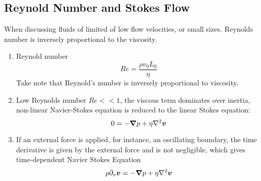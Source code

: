\documentclass[12pt,a4paper]{article}
\begin{document}
        \subsection{Reynold Number and Stokes Flow}
            When discussing fluids of limited of low flow velocities, or small sizes. Reynolds number is inversely proportional to the viscosity.
            \begin{enumerate}
                \item Reynold number 
                $$
                    Re =\frac{\rho v_0 L_0}{\eta}
                $$
                Take note that Reynold's number is inversely proportional to viscosity.
                \item Low Reynolds number $Re << 1$, the viscous term dominates over inertia, non-linear Navier-Stokes equation is reduced to the linear Stokes equation:
                $$
                    0 = -\grad p +\eta\laplacian \vb*{v}
                $$
                \item If an external force is applied, for instance, an oscillating boundary, the time derivative is given by the external force and is not negligible, which gives time-dependent Navier Stokes Equation
                $$
                    \rho \partial_{v}\vb*{v} = -\grad p +\eta\laplacian \vb*{v}
                $$
            \end{enumerate}
\end{document}
